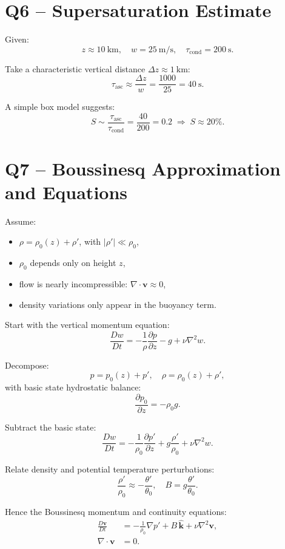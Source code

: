 \documentclass[12pt,a4paper]{article}
\begin{document}
\section*{Q6 -- Supersaturation Estimate}

Given:
\[
z \approx \SI{10}{\kilo\meter}, \quad
w = \SI{25}{\meter\per\second}, \quad
\tau_{\text{cond}} = \SI{200}{\second}.
\]

Take a characteristic vertical distance
\(\Delta z \approx \SI{1}{\kilo\meter}\):
\[
\tau_{\text{asc}} \approx \frac{\Delta z}{w}
= \frac{1000}{25} = \SI{40}{\second}.
\]

A simple box model suggests:
\[
S \sim \frac{\tau_{\text{asc}}}{\tau_{\text{cond}}}
= \frac{40}{200} = 0.2
\;\Rightarrow\;
S \approx 20\% .
\]

\section*{Q7 -- Boussinesq Approximation and Equations}

Assume:
\begin{itemize}
  \item \(\rho = \rho_0(z) + \rho'\), with \(|\rho'| \ll \rho_0\),
  \item \(\rho_0\) depends only on height \(z\),
  \item flow is nearly incompressible: \(\nabla\cdot\mathbf{v} \approx 0\),
  \item density variations only appear in the buoyancy term.
\end{itemize}

Start with the vertical momentum equation:
\[
\frac{Dw}{Dt} = -\frac{1}{\rho}\frac{\partial p}{\partial z} - g + \nu \nabla^2 w.
\]

Decompose:
\[
p = p_0(z) + p', \quad
\rho = \rho_0(z) + \rho',
\]
with basic state hydrostatic balance:
\[
\frac{\partial p_0}{\partial z} = -\rho_0 g.
\]

Subtract the basic state:
\[
\frac{Dw}{Dt} =
-\frac{1}{\rho_0}\frac{\partial p'}{\partial z}
+ g\frac{\rho'}{\rho_0}
+ \nu \nabla^2 w.
\]

Relate density and potential temperature perturbations:
\[
\frac{\rho'}{\rho_0}
\approx -\frac{\theta'}{\theta_0},
\quad
B = g\frac{\theta'}{\theta_0}.
\]

Hence the Boussinesq momentum and continuity equations:
\begin{align*}
\frac{D\mathbf{v}}{Dt}
&= -\frac{1}{\rho_0}\nabla p'
   + B\,\hat{\mathbf{k}}
   + \nu \nabla^2\mathbf{v},\\
\nabla\cdot\mathbf{v} &= 0.
\end{align*}
\end{document}
